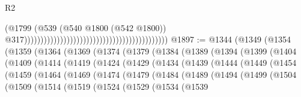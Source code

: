 \begin{lexlean}{R2}
\begin{coremodule}
                                                                                        (@1799
                                                                                          (@539
                                                                                            (@540
                                                                                              @1800
                                                                                              (@542
                                                                                                @1800))
                                                                                            @317))))))))))))))))))))))))))))))))))))))))))))
@1897 := @1344
    (@1349
      (@1354
        (@1359
          (@1364
            (@1369
              (@1374
                (@1379
                  (@1384
                    (@1389
                      (@1394
                        (@1399
                          (@1404
                            (@1409
                              (@1414
                                (@1419
                                  (@1424
                                    (@1429
                                      (@1434
                                        (@1439
                                          (@1444
                                            (@1449
                                              (@1454
                                                (@1459
                                                  (@1464
                                                    (@1469
                                                      (@1474
                                                        (@1479
                                                          (@1484
                                                            (@1489
                                                              (@1494
                                                                (@1499
                                                                  (@1504
                                                                    (@1509
                                                                      (@1514
                                                                        (@1519
                                                                          (@1524
                                                                            (@1529
                                                                              (@1534
                                                                                (@1539

\end{coremodule}
\end{lexlean}
